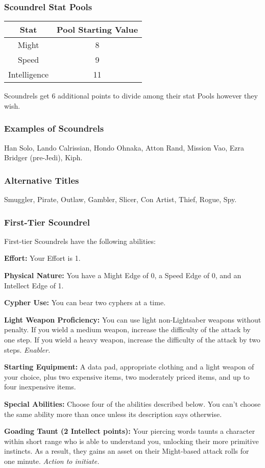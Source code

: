 \documentclass[a4paper,10pt,final,twocolumn,oneside]{book}
\newcommand{\statPool}[5]
{
	\subsubsection*{#1 Stat Pools}
	\label{subsub:#1StatPools}
	\begin{center}
	\begin{tabular}{ |c|c| }
	\hline
	\textbf{Stat} & \textbf{Pool Starting Value} \\
	\hline \hline
	Might & #2 \\
	\hline
 	Speed & #3  \\
 	\hline
 	Intelligence & #4  \\
 	\hline
	\end{tabular}
	\end{center}
	#1s get #5 additional points to divide among their stat Pools however they wish.
}
\newcommand{\itemLine}[2]{\textbf{#1:}{ #2}\par}
\newcommand{\itemAbility}[2]{\textcolor{25gray}{\textbullet\textbf{ #1:}}{ #2}\par}
\newcommand{\enabler}{\textit{ Enabler.}}
\newcommand{\actionInit}{\textit{ Action to initiate.}}
\begin{document}
\statPool{Scoundrel}{8}{9}{11}{6}

\subsubsection*{Examples of Scoundrels}
\label{subsub:scoundrelExamples}

Han Solo, Lando Calrissian, Hondo Ohnaka, Atton Rand, Mission Vao, Ezra Bridger (pre-Jedi), Kiph.

\subsubsection*{Alternative Titles}
\label{subsub:scoundrelAlternative}

Smuggler, Pirate, Outlaw, Gambler, Slicer, Con Artist, Thief, Rogue, Spy.


\subsubsection*{First-Tier Scoundrel}
\label{subsub:scoundrelFirstTier}

First-tier Scoundrels have the following abilities:

\itemLine{Effort}{Your Effort is 1.}

\itemLine{Physical Nature}{You have a Might Edge of 0, a Speed Edge of 0, and an Intellect Edge of 1.}

\itemLine{Cypher Use}{You can bear two cyphers at a time.}

\itemLine{Light Weapon Proficiency}{You can use light non-Lightsaber weapons without penalty. If you wield a medium weapon, increase the difficulty of the attack by one step. If you wield a heavy weapon, increase the difficulty of the attack by two steps.\enabler}

\itemLine{Starting Equipment}{A data pad, appropriate clothing and a light weapon of your choice, plus two expensive items, two moderately priced items, and up to four inexpensive items.}

\itemLine{Special Abilities}{Choose four of the abilities described below. You can’t choose the same ability more than once unless its description says otherwise.}

\itemAbility{Goading Taunt (2 Intellect points)}{Your piercing words taunts a character within short range who is able to understand you, unlocking their more primitive instincts. As a result, they gains an asset on their Might-based attack rolls for one minute.\actionInit}
\end{document}
